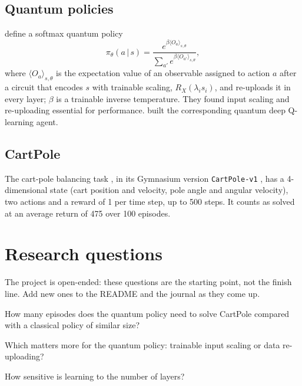 \documentclass[11pt,a4paper]{article}
\begin{document}
\subsection{Quantum policies}
\citet{jerbi2021} define a softmax quantum policy
\begin{equation}
  \pi_\theta(a\,|\,s)=\frac{e^{\beta\langle O_a\rangle_{s,\theta}}}{\sum_{a'}e^{\beta\langle O_{a'}\rangle_{s,\theta}}},
\end{equation}
where $\langle O_a\rangle_{s,\theta}$ is the expectation value of an observable assigned to action $a$
after a circuit that encodes $s$ with trainable scaling, $R_X(\lambda_is_i)$, and re-uploads it in
every layer; $\beta$ is a trainable inverse temperature. They found input scaling and re-uploading
essential for performance. \citet{skolik2022} built the corresponding quantum deep Q-learning agent.

\subsection{CartPole}
The cart-pole balancing task \citep{barto1983}, in its Gymnasium version \texttt{CartPole-v1}
\citep{towers2024}, has a 4-dimensional state (cart position and velocity, pole angle and angular
velocity), two actions and a reward of 1 per time step, up to 500 steps. It counts as solved at an
average return of 475 over 100 episodes.

\section{Research questions}
The project is open-ended: these questions are the starting point, not the finish line. Add new
ones to the README and the journal as they come up.

\begin{rqlist}
  \item How many episodes does the quantum policy need to solve CartPole compared with a classical policy of similar size?
  \item Which matters more for the quantum policy: trainable input scaling or data re-uploading?
  \item How sensitive is learning to the number of layers?
\end{rqlist}

\end{document}
